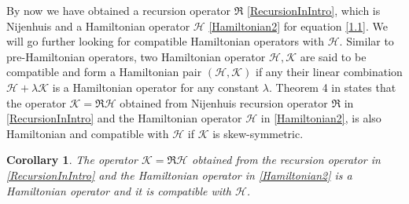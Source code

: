 \documentclass{article}
\numberwithin{equation}{section}
\newtheorem{corollary}{Corollary}[section]
\begin{document}
By now we have obtained a recursion operator
$\mathfrak{R}$ \eqref{RecursionInIntro}, which is Nijenhuis and a Hamiltonian operator
$\mathcal{H}$ \eqref{Hamiltonian2} for equation \eqref{1.1}. We will go further looking for
compatible Hamiltonian operators with $\mathcal{H}$. Similar to pre-Hamiltonian operators, two
Hamiltonian operator $\mathcal{H},\mathcal{K}$ are said to be compatible and 
form a Hamiltonian pair $\left(\mathcal{H},\mathcal{K}\right)$ if any their linear
combination $\mathcal{H}+\lambda \mathcal{K}$ is a Hamiltonian operator
for any constant $\lambda$.
Theorem 4 in \cite{42} states that the operator
$\mathcal{K} = \mathfrak{R} \mathcal{H}$ obtained from Nijenhuis recursion operator
$\mathfrak{R}$ in \eqref{RecursionInIntro} and the Hamiltonian operator $\mathcal{H}$ in
\eqref{Hamiltonian2}, is also Hamiltonian and compatible
with $\mathcal{H}$ if $\mathcal{K}$ is skew-symmetric.
	\begin{corollary}
		The operator $\mathcal{K} = \mathfrak{R} \mathcal{H}$ obtained 
from the recursion operator in \eqref{RecursionInIntro} and the Hamiltonian operator in
\eqref{Hamiltonian2} is a Hamiltonian operator and it is compatible with 
$\mathcal{H}$.
	\end{corollary}
\end{document}
